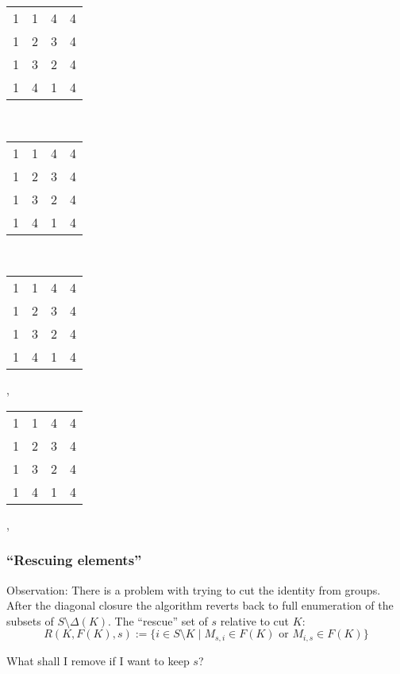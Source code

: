 \documentclass{beamer}
\newcommand{\jump}{\vskip6pt}
\newcommand{\jmp}{\vskip3pt}
\begin{document}
\begin{frame}
\begin{center}
\begin{tabular}{@{}c@{}c@{}c@{}c@{}}
1&\color{lgr}1&\color{lgr}4&4\\
\color{lgr}1&\color{lgr}2&\color{lgr}3&\color{lgr}4\\
\color{lgr}1&\color{lgr}3&\color{lgr}2&\color{lgr}4\\
1&\color{lgr}4&\color{lgr}1&4\\
\end{tabular}\\\jmp 
\begin{tabular}{@{}c@{}c@{}c@{}c@{}}
\color{lgr}1&\color{lgr}1&\color{lgr}4&\color{lgr}4\\
\color{lgr}1&2&\color{lgr}3&\color{lgr}4\\
\color{lgr}1&\color{lgr}3&\color{lgr}2&\color{lgr}4\\
\color{lgr}1&\color{lgr}4&\color{lgr}1&\color{lgr}4\\
\end{tabular}\ \ \ \ \ \ \ \ \ \ \ \ \ 
\begin{tabular}{@{}c@{}c@{}c@{}c@{}}
1&\color{lgr}1&\color{lgr}4&\color{lgr}4\\
\color{lgr}1&\color{lgr}2&\color{lgr}3&\color{lgr}4\\
\color{lgr}1&\color{lgr}3&\color{lgr}2&\color{lgr}4\\
\color{lgr}1&\color{lgr}4&\color{lgr}1&\color{lgr}4\\
\end{tabular},\ \ \ 
\begin{tabular}{@{}c@{}c@{}c@{}c@{}}
\color{lgr}1&\color{lgr}1&\color{lgr}4&\color{lgr}4\\
\color{lgr}1&\color{lgr}2&\color{lgr}3&\color{lgr}4\\
\color{lgr}1&\color{lgr}3&\color{lgr}2&\color{lgr}4\\
\color{lgr}1&\color{lgr}4&\color{lgr}1&4\\
\end{tabular},\ \ \ 


\end{center}
\end{frame}


\begin{frame}\frametitle{``Rescuing elements''}
Observation: There is a problem with trying to cut the identity from groups. After the diagonal closure the algorithm reverts back to full enumeration of the subsets of $S\setminus \Delta(K)$.
\jump
The ``rescue'' set of $s$ relative to cut $K$:
$$ R(K,F(K),s):=\{i\in S\setminus K\mid M_{s,i}\in F(K) \text{ or } M_{i,s}\in F(K)\}$$

What shall I remove if I want to keep $s$?

\end{frame}
\end{document}
